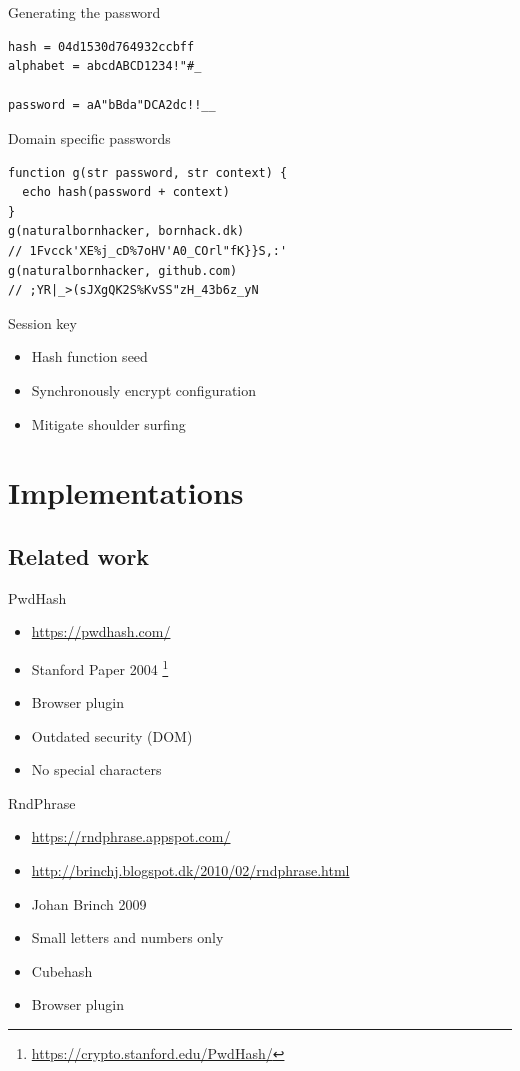 \documentclass{beamer}
\begin{document}
\begin{frame}[fragile]{Generating the password}
  \begin{verbatim}
hash = 04d1530d764932ccbff
alphabet = abcdABCD1234!"#_

password = aA"bBda"DCA2dc!!__
  \end{verbatim}
\end{frame}

\begin{frame}[fragile]{Domain specific passwords}
  \begin{verbatim}
function g(str password, str context) {
  echo hash(password + context)
}
g(naturalbornhacker, bornhack.dk)
// 1Fvcck'XE%j_cD%7oHV'A0_COrl"fK}}S,:'
g(naturalbornhacker, github.com)
// ;YR|_>(sJXgQK2S%KvSS"zH_43b6z_yN
  \end{verbatim}
\end{frame}

\begin{frame}[fragile]{Session key}
  \begin{itemize}
    \item Hash function seed
    \item Synchronously encrypt configuration
    \item Mitigate shoulder surfing
  \end{itemize}
\end{frame}


\section{Implementations}
\subsection{Related work}
\begin{frame}{PwdHash}
  \begin{itemize}
    \item \url{https://pwdhash.com/}
    \item Stanford Paper 2004 \footnote{\url{https://crypto.stanford.edu/PwdHash/}}
    \item Browser plugin
    \item Outdated security (DOM)
    \item No special characters
  \end{itemize}
\end{frame}

\begin{frame}{RndPhrase}
  \begin{itemize}
    \item \url{https://rndphrase.appspot.com/}
    \item \url{http://brinchj.blogspot.dk/2010/02/rndphrase.html}
    \item Johan Brinch 2009
    \item Small letters and numbers only
    \item Cubehash
    \item Browser plugin
  \end{itemize}
\end{frame}
\end{document}
